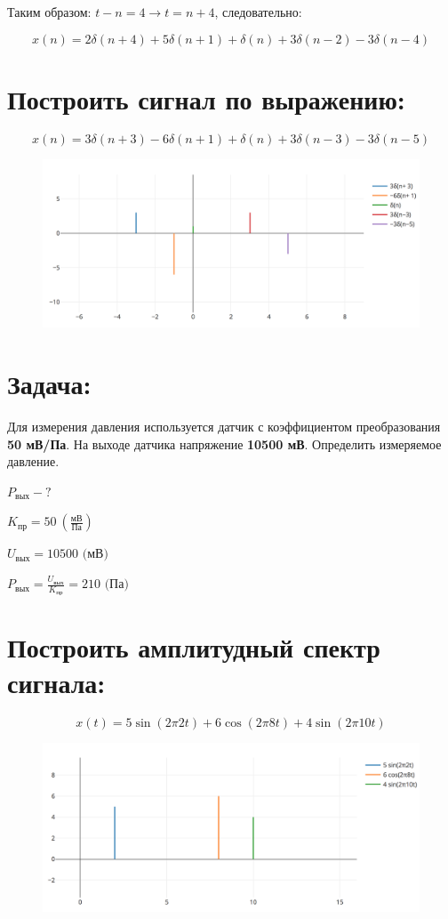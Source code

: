 \documentclass{article}
\begin{document}
Таким образом: $t-n=4 \rightarrow t=n+4$, следовательно:

\begin{equation*}
    x(n) = 2\delta(n+4) + 5\delta(n+1) + \delta(n) + 3\delta(n-2) - 3\delta(n-4)
\end{equation*}

\section{Построить сигнал по выражению:}
\begin{equation}
    x(n) = 3\delta(n+3) - 6\delta(n+1) + \delta(n) + 3\delta(n-3) - 3\delta(n-5)
\end{equation}
\begin{figure}[h]
    \centering
    \includegraphics[width=1\textwidth]{plot6.png}
\end{figure}

\newpage
\section{Задача:}
Для измерения давления используется датчик с коэффициентом преобразования \textbf{50 мВ/Па}.
На выходе датчика напряжение \textbf{10500 мВ}. Определить измеряемое давление.

$P_{\text{вых}} -?$

$K_{\text{пр}} = 50\:(\frac{\text{мВ}}{\text{Па}})$

$U_{\text{вых}} = 10500 \text{ (мВ)}$

$P_{\text{вых}} = \frac{U_{\text{вых}}}{K_{\text{пр}}} = 210 \text{ (Па)}$

\section{Построить амплитудный спектр сигнала:}
\begin{equation}
    x(t) = 5\sin(2\pi 2t) + 6\cos(2\pi 8t) +4\sin(2\pi 10t)
\end{equation}

\begin{figure}[h]
    \centering
    \includegraphics[width=1\textwidth]{plot8.png}
\end{figure}
\end{document}
